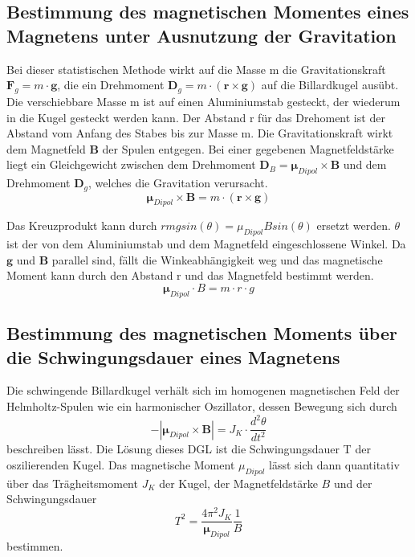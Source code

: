\subsection{Bestimmung des magnetischen Momentes eines Magnetens unter Ausnutzung der Gravitation}
\label{sec:Gravitation}
Bei dieser statistischen Methode wirkt auf die Masse m die Gravitationskraft $\symbf{F}_g = m \cdot \symbf{g}$,
die ein Drehmoment $\symbf{D}_g = m \cdot (\symbf{r} \times \symbf{g})$ auf die Billardkugel ausübt.
Die verschiebbare Masse m ist auf einen Aluminiumstab gesteckt, der wiederum in die Kugel gesteckt werden kann.
Der Abstand r für das Drehoment ist der Abstand vom Anfang des Stabes bis zur Masse m.
Die Gravitationskraft wirkt dem Magnetfeld $\symbf{B}$ der Spulen entgegen.
Bei einer gegebenen Magnetfeldstärke liegt ein Gleichgewicht zwischen dem Drehmoment $\symbf{D}_B = \symbf{\mu}_{Dipol} \times \symbf{B}$ und dem Drehmoment $\symbf{D}_g$,
welches die Gravitation verursacht.
\begin{equation}
    \symbf{\mu}_{Dipol} \times \symbf{B} = m \cdot (\symbf{r} \times \symbf{g})
\end{equation}

Das Kreuzprodukt kann durch $ r m g sin(\theta) = \mu_{Dipol} B sin(\theta)$ ersetzt werden.
$\theta$ ist der von dem Aluminiumstab und dem Magnetfeld eingeschlossene Winkel.
Da $\symbf{g}$ und $\symbf{B}$ parallel sind, fällt die Winkeabhängigkeit weg und das magnetische Moment kann durch den Abstand r und das Magnetfeld bestimmt werden.
\begin{equation}
    \symbf{\mu}_{Dipol} \cdot B = m \cdot r \cdot g
    \label{eqn:gravitation}
\end{equation}


\subsection{Bestimmung des magnetischen Moments über die Schwingungsdauer eines Magnetens}
\label{sec:Schwingungsdauer}
Die schwingende Billardkugel verhält sich im homogenen magnetischen Feld der Helmholtz-Spulen wie ein harmonischer Oszillator,
dessen Bewegung sich durch
\begin{equation}
    -|\symbf{\mu}_{Dipol} \times \symbf{B}| = J_K \cdot \frac{d^2\theta}{dt^2}
\end{equation}
beschreiben lässt. Die Lösung dieses DGL ist die Schwingungsdauer T der oszilierenden Kugel.
Das magnetische Moment $\mu_{Dipol}$ lässt sich dann quantitativ über das Trägheitsmoment $J_K$ der Kugel,
der Magnetfeldstärke $B$ und der Schwingungsdauer
\begin{equation}
    T^2 = \frac{4 \pi^2 J_{K}}{\symbf{\mu}_{Dipol}} \frac{1}{B}
    \label{eqn:schwingung}
\end{equation}
bestimmen.

